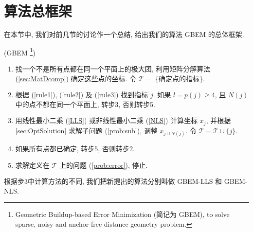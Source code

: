 \documentclass{CASthesis_zzk}
\begin{document}
\section{算法总框架}
\label{sec:framework}
在本节中, 我们对前几节的讨论作一个总结,
给出我们的算法 GBEM
的总体框架.
%
%

\begin{Alg} (GBEM \footnote{Geometric Buildup-based Error Minimization (简记为 GBEM), to solve sparse, noisy and anchor-free distance geometry problem.})
  \begin{adjustwidth}{1cm}{0cm}
    \begin{enumerate}[步1.]
      \item 找一个不是所有点都在同一个平面上的极大团, 利用矩阵分解算法 (\ref{sec:MatDcomp}) 确定这些点的坐标. 令 $\mathcal{T}=$ \{确定点的指标\}.
      \item 根据 (\ref{rule1}), (\ref{rule2}) 及 (\ref{rule3}) 找到指标 $j$. 如果 $l=p(j)\geq 4$, 且 $N(j)$ 中的点不都在同一个平面上, 转步3, 否则转步5.
      \item 用线性最小二乘 (\ref{LLS}) 或非线性最小二乘 (\ref{NLS}) 计算坐标 $x_j$, 并根据 \ref{sec:OptSolution} 求解子问题 (\ref{prob:sub}), 调整 $x_{j\cup N(j)}$. 令 $\mathcal{T}=\mathcal{T}\cup \{j\}$.
      \item 如果所有点都已确定, 转步5, 否则转步2.
      \item 求解定义在 $\mathcal{T}$ 上的问题 (\ref{prob:error}), 停止.
    \end{enumerate}
  \end{adjustwidth}
  \label{alg:GBEM}
\end{Alg}
根据步3中计算方法的不同, 我们把新提出的算法分别叫做
GBEM-LLS 和 GBEM-NLS.
\end{document}
